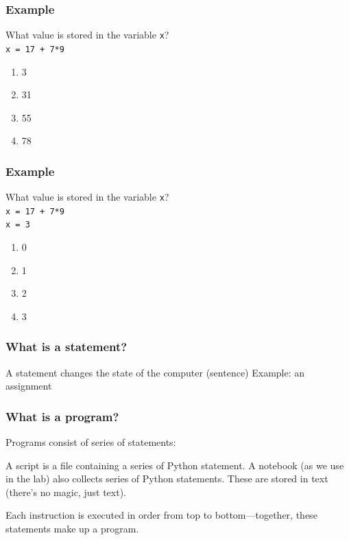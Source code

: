 \documentclass[11pt]{beamer}
\begin{document}
\begin{frame}
  \frametitle{Example}
  \Enlarge

  What value is stored in the variable \texttt{x}? \\
  \texttt{x = 17 + 7*9}
  \begin{enumerate}[label=\Alph*]
  \item  3
  \item  31
  \item  55
  \item  78
  \end{enumerate}
\end{frame}

\begin{frame}
  \frametitle{Example}
  \Enlarge

  What value is stored in the variable \texttt{x}? \\
  \texttt{x = 17 + 7*9} \\
  \texttt{x = 3}
  \begin{enumerate}[label=\Alph*]
  \item  0
  \item  1
  \item  2
  \item  3
  \end{enumerate}
\end{frame}

\begin{frame}
  \frametitle{What is a \textbf{statement}?}
  \Enlarge

  \begin{itemize}
  \myitem  A statement changes the state of the computer (sentence) \pause
  \myitem  Example:  an assignment
  \end{itemize}
\end{frame}

\begin{frame}
  \frametitle{What is a \textbf{program}?}
  \Enlarge

  \begin{itemize}
  \myitem  Programs consist of series of statements: \pause
    \begin{itemize}
    \mysubitem  A script is a file containing a series of Python statement. \pause
    \mysubitem  A notebook (as we use in the lab) also collects series of Python statements. \pause
    \mysubitem  These are stored in text (there’s no magic, just text). \pause
  \end{itemize}
  \myitem  Each instruction is executed in order from top to bottom—together, these statements make up a program.
  \end{itemize}
 \end{frame}
\end{document}
